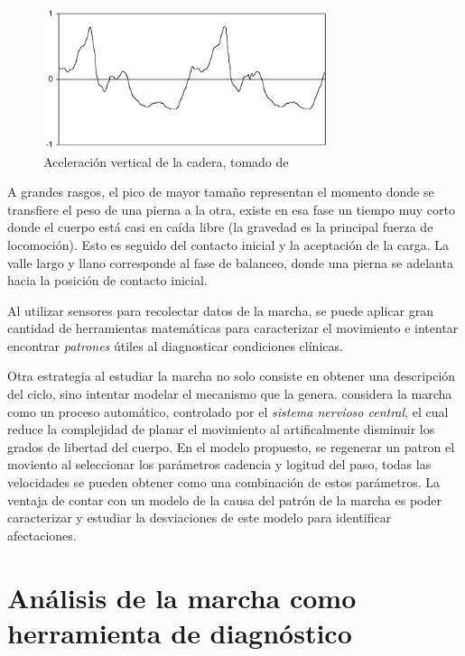 \begin{figure}
    \centering
    \includegraphics[width = 0.75\textwidth]{imagenes/menz_acceleration}
    \caption{Aceleración vertical de la cadera, tomado de \citep{menz}}
    \label{fig:menz_acc_ver}
\end{figure}

A grandes rasgos, el pico de mayor tamaño representan el momento donde se transfiere el peso de una pierna a la otra, existe en esa fase un tiempo muy corto donde el cuerpo está casi en caída libre (la gravedad es la principal fuerza de locomoción). Esto es seguido del contacto inicial y la aceptación de la carga. La valle largo y llano corresponde al fase de balanceo, donde una pierna se adelanta hacia la posición de contacto inicial.

Al utilizar sensores para recolectar datos de la marcha, se puede aplicar gran cantidad de herramientas matemáticas para caracterizar el movimiento e intentar encontrar \emph{patrones} útiles al diagnosticar condiciones clínicas. 

Otra estrategia al estudiar la marcha no solo consiste en obtener una descripción del ciclo, sino intentar modelar el mecanismo que la genera. \cite{dejnabadi} considera la marcha como un proceso automático, controlado por el \emph{sistema nervioso central}, el cual reduce la complejidad de planar el movimiento al artificalmente disminuir los grados de libertad del cuerpo. En el modelo propuesto, se regenerar un patron el moviento al seleccionar los parámetros cadencia y logitud del paso, todas las velocidades se pueden obtener como una combinación de estos parámetros. La ventaja de contar con un modelo de la causa del patrón de la marcha es poder caracterizar y estudiar la desviaciones de este modelo para identificar afectaciones. 



\section[Herramienta de diagnóstico]{Análisis de la marcha como herramienta de diagnóstico}

